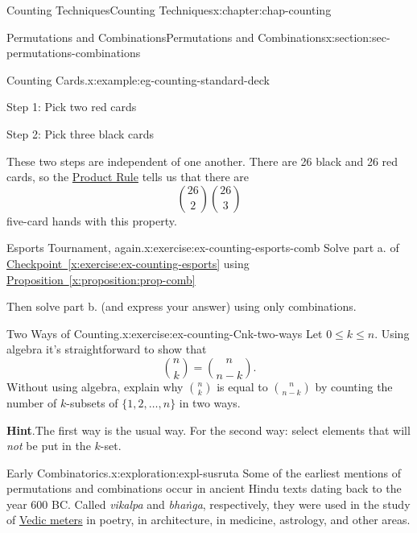\documentclass[oneside,10pt,]{book}
\newcommand{\blocktitlefont}{\relax}
\newcommand{\xreffont}{\relax}
\numberwithin{equation}{section}
\begin{document}
\begin{chapterptx}{Counting Techniques}{}{Counting Techniques}{}{}{x:chapter:chap-counting}
\begin{sectionptx}{Permutations and Combinations}{}{Permutations and Combinations}{}{}{x:section:sec-permutations-combinations}
\begin{example}{Counting Cards.}{x:example:eg-counting-standard-deck}
\begin{sidebyside}{2}{0.05}{0.05}{0.1}
\begin{sbspanel}{0.4}%
Step 1: Pick two red cards%
\end{sbspanel}%
\begin{sbspanel}{0.4}%
\par
Step 2: Pick three black cards%
\end{sbspanel}%
\end{sidebyside}%
\par
These two steps are independent of one another. There are 26 black and 26 red cards, so the \hyperref[x:principle:prin-prod-rule]{Product Rule} tells us that there are%
\begin{equation*}
\binom{26}{2}\binom{26}{3}
\end{equation*}
five-card hands with this property.%
\end{example}
\begin{inlineexercise}{Esports Tournament, again.}{x:exercise:ex-counting-esports-comb}%
Solve part a. of \hyperref[x:exercise:ex-counting-esports]{Checkpoint~{\xreffont\ref{x:exercise:ex-counting-esports}}} using \hyperref[x:proposition:prop-comb]{Proposition~{\xreffont\ref{x:proposition:prop-comb}}}%
\par
Then solve part b. (and express your answer) using only combinations.%
\end{inlineexercise}
\begin{inlineexercise}{Two Ways of Counting.}{x:exercise:ex-counting-Cnk-two-ways}%
Let \(0 \leq k \leq n\). Using algebra it's straightforward to show that%
\begin{equation*}
\binom{n}{k} = \binom{n}{n-k}\text{.}
\end{equation*}
Without using algebra, explain why \(\displaystyle\binom{n}{k}\) is equal to \(\displaystyle\binom{n}{n-k}\) by counting the number of \(k\)-subsets of \(\{1,2,\ldots,n\}\) in two ways.%
\par\smallskip%
\noindent\textbf{\blocktitlefont Hint}.\hypertarget{g:hint:id418804}{}\quad{}The first way is the usual way. For the second way: select elements that will \emph{not} be put in the \(k\)-set.%
\end{inlineexercise}
\begin{exploration}{Early Combinatorics.}{x:exploration:expl-susruta}%
Some of the earliest mentions of permutations and combinations occur in ancient Hindu texts dating back to the year 600 BC. Called \emph{vikalpa} and \emph{bhaṅga}, respectively, they were used in the study of \href{https://en.wikipedia.org/wiki/Sanskrit_prosody}{Vedic meters} in poetry, in architecture, in medicine, astrology, and other areas.%

\end{exploration}
\end{sectionptx}
\end{chapterptx}
\end{document}
